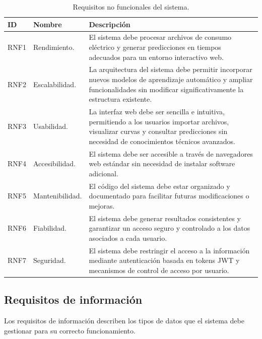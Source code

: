 \documentclass[12pt,a4paper]{report}
\begin{document}
\begin{table}[H]
\centering
\begin{tabular}{|p{2cm}|p{5cm}|p{7cm}|}
\hline
\textbf{ID} & \textbf{Nombre} & \textbf{Descripción} \\ \hline

RNF1 & Rendimiento. & El sistema debe procesar archivos de consumo eléctrico y generar predicciones en tiempos adecuados para un entorno interactivo web. \\ \hline

RNF2 & Escalabilidad. & La arquitectura del sistema debe permitir incorporar nuevos modelos de aprendizaje automático y ampliar funcionalidades sin modificar significativamente la estructura existente. \\ \hline

RNF3 & Usabilidad. & La interfaz web debe ser sencilla e intuitiva, permitiendo a los usuarios importar archivos, visualizar curvas y consultar predicciones sin necesidad de conocimientos técnicos avanzados. \\ \hline

RNF4 & Accesibilidad. & El sistema debe ser accesible a través de navegadores web estándar sin necesidad de instalar software adicional. \\ \hline

RNF5 & Mantenibilidad. & El código del sistema debe estar organizado y documentado para facilitar futuras modificaciones o mejoras. \\ \hline

RNF6 & Fiabilidad. & El sistema debe generar resultados consistentes y garantizar un acceso seguro y controlado a los datos asociados a cada usuario. \\ \hline

RNF7 & Seguridad. & El sistema debe restringir el acceso a la información mediante autenticación basada en tokens JWT y mecanismos de control de acceso por usuario. \\ \hline

\end{tabular}
\caption{Requisitos no funcionales del sistema.}
\end{table}


\subsection{Requisitos de información}

Los requisitos de información describen los tipos de datos que el sistema debe gestionar para su correcto funcionamiento.
\end{document}
